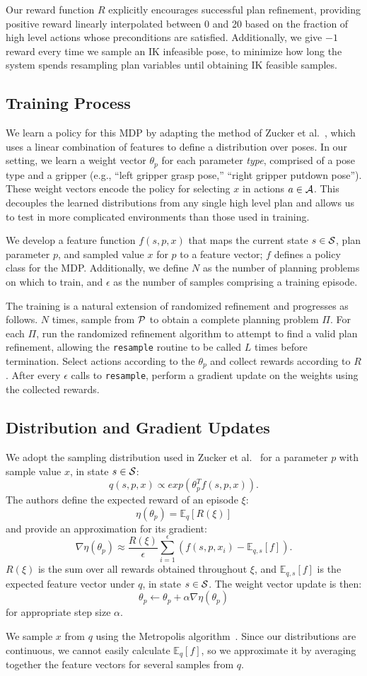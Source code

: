 Our reward function $R$ explicitly encourages successful plan refinement, providing positive reward linearly
interpolated between 0 and 20 based on the fraction of high level actions whose preconditions are
satisfied. Additionally, we give $-1$ reward every time we sample an IK infeasible pose,
to minimize how long the system spends resampling plan variables until obtaining IK feasible samples.

\subsection{Training Process}
We learn a policy for this MDP by adapting the method of Zucker et al.~\cite{workspacebias}, which
uses a linear combination of features to define a distribution over poses. In our setting, we learn a weight
vector $\theta_{p}$ for each parameter \emph{type}, comprised of a pose type and a gripper
(e.g., ``left gripper grasp pose,'' ``right gripper putdown pose'').
These weight vectors encode the policy for selecting $x$ in actions $a \in \mathcal{A}$.
This decouples the learned distributions from any single high level plan and allows us to
test in more complicated environments than those used in training.

We develop a feature function $f(s, p, x)$ that maps the current
state $s \in \mathcal{S}$, plan parameter $p$, and sampled value $x$ for $p$ to a
feature vector; $f$ defines a policy class for the MDP. Additionally, we define
$N$ as the number of planning problems on which to train, and
$\epsilon$ as the number of samples comprising a training episode.

The training is a natural extension of randomized
refinement and progresses as follows. $N$ times, sample from $\mathcal{P}$ to obtain
a complete planning problem $\Pi$. For each $\Pi$, run the randomized refinement
algorithm to attempt to find a valid plan refinement, allowing the \texttt{resample}
routine to be called $L$ times before termination. Select actions according to the $\theta_{p}$
and collect rewards according to $R$. After every $\epsilon$ calls to
\texttt{resample}, perform a gradient update on the weights using the
collected rewards.

\subsection{Distribution and Gradient Updates}
We adopt the sampling distribution used in Zucker et al.~\cite{workspacebias}
for a parameter $p$ with sample value $x$, in state $s \in \mathcal{S}$:
$$q(s, p, x) \propto exp(\theta_{p}^{T} f(s, p, x)).$$
The authors define the expected reward of an episode $\xi$:
$$\eta(\theta_{p}) = \mathbb{E}_{q}[R(\xi)]$$ and provide an approximation for its gradient:
$$\nabla \eta(\theta_{p}) \approx \frac{R(\xi)}{\epsilon} \sum_{i=1}^{\epsilon}(f(s, p, x_{i}) - \mathbb{E}_{q,s}[f]).$$
$R(\xi)$ is the sum over all rewards obtained throughout $\xi$, and
$\mathbb{E}_{q,s}[f]$ is the expected feature vector under $q$, in state $s \in \mathcal{S}$. The weight vector update is then:
$$\theta_{p} \leftarrow \theta_{p} + \alpha \nabla \eta(\theta_{p})$$
for appropriate step size $\alpha$.

We sample $x$ from $q$ using the Metropolis algorithm~\cite{chib1995understanding}.
Since our distributions are continuous, we cannot easily calculate $\mathbb{E}_{q}[f]$,
so we approximate it by averaging together the feature vectors for several samples from $q$.